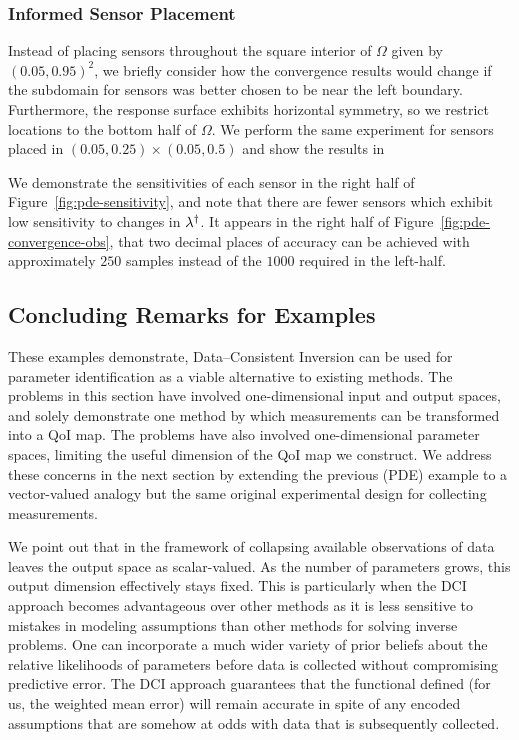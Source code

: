 \subsubsection{Informed Sensor Placement}
Instead of placing sensors throughout the square interior of $\Omega$ given by $(0.05, 0.95)^2$, we briefly consider how the convergence results would change if the subdomain for sensors was better chosen to be near the left boundary.
Furthermore, the response surface exhibits horizontal symmetry, so we restrict locations to the bottom half of $\Omega$.
We perform the same experiment for sensors placed in $(0.05, 0.25)\times(0.05, 0.5)$ and show the results in

We demonstrate the sensitivities of each sensor in the right half of Figure~\ref{fig:pde-sensitivity}, and note that there are fewer sensors which exhibit low sensitivity to changes in $\lambda^\dagger$.
It appears in the right half of Figure~\ref{fig:pde-convergence-obs}, that two decimal places of accuracy can be achieved with approximately $250$ samples instead of the $1000$ required in the left-half.

\FloatBarrier

\subsection{Concluding Remarks for Examples}

These examples demonstrate, Data--Consistent Inversion can be used for parameter identification as a viable alternative to existing methods.
The problems in this section have involved one-dimensional input and output spaces, and solely demonstrate one method by which measurements can be transformed into a QoI map.
The problems have also involved one-dimensional parameter spaces, limiting the useful dimension of the QoI map we construct.
We address these concerns in the next section by extending the previous (PDE) example to a vector-valued analogy but the same original experimental design for collecting measurements.

We point out that in the framework of collapsing available observations of data leaves the output space as scalar-valued.
As the number of parameters grows, this output dimension effectively stays fixed.
This is particularly when the DCI approach becomes advantageous over other methods as it is less sensitive to mistakes in modeling assumptions than other methods for solving inverse problems.
One can incorporate a much wider variety of prior beliefs about the relative likelihoods of parameters before data is collected without compromising predictive error.
The DCI approach guarantees that the functional defined (for us, the weighted mean error) will remain accurate in spite of any encoded assumptions that are somehow at odds with data that is subsequently collected.

